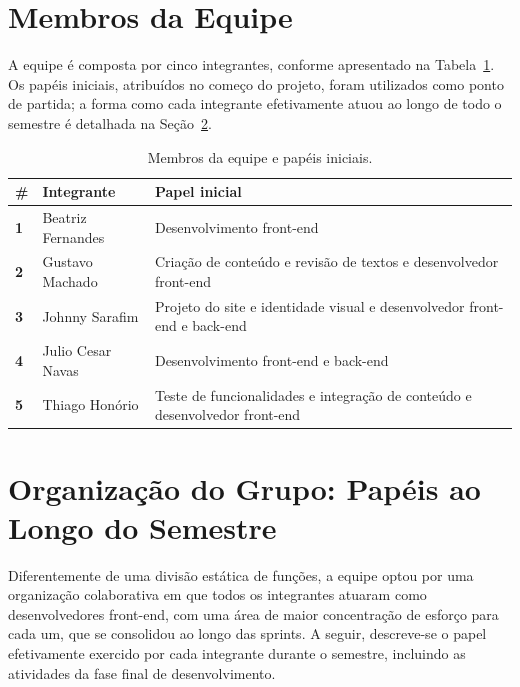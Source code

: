 \documentclass[12pt,a4paper]{article}
\begin{document}
\section{Membros da Equipe}

A equipe é composta por cinco integrantes, conforme apresentado na Tabela~\ref{tab:membros}. Os
papéis iniciais, atribuídos no começo do projeto, foram utilizados como ponto de partida; a forma
como cada integrante efetivamente atuou ao longo de todo o semestre é detalhada na
Seção~\ref{sec:papeis-semestre}.

\begin{table}[H]
\centering
\caption{Membros da equipe e papéis iniciais.}
\label{tab:membros}
\renewcommand{\arraystretch}{1.4}
\begin{tabular}{>{\centering\bfseries}m{0.5cm} >{\raggedright}m{4.5cm} >{\raggedright\arraybackslash}m{7.5cm}}
\toprule
\textbf{\#} & \textbf{Integrante} & \textbf{Papel inicial} \\
\midrule
1 & Beatriz Fernandes & Desenvolvimento front-end  \\
2 & Gustavo Machado & Criação de conteúdo e revisão de textos e desenvolvedor front-end \\
3 & Johnny Sarafim & Projeto do site e identidade visual e desenvolvedor front-end e back-end \\
4 & Julio Cesar Navas & Desenvolvimento front-end e back-end \\
5 & Thiago Honório & Teste de funcionalidades e integração de conteúdo e desenvolvedor front-end \\
\bottomrule
\end{tabular}
\end{table}

\section{Organização do Grupo: Papéis ao Longo do Semestre}
\label{sec:papeis-semestre}

Diferentemente de uma divisão estática de funções, a equipe optou por uma organização
colaborativa em que todos os integrantes atuaram como desenvolvedores front-end, com uma
área de maior concentração de esforço para cada um, que se consolidou ao longo das sprints. A
seguir, descreve-se o papel efetivamente exercido por cada integrante durante o semestre,
incluindo as atividades da fase final de desenvolvimento.
\end{document}
